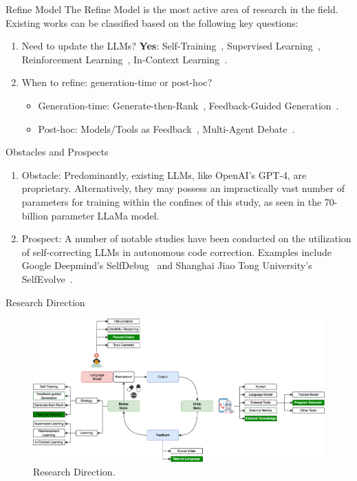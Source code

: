 \begin{frame}{Refine Model}
    The Refine Model is the most active area of research in the field. Existing works can be classified based on the following key questions:
    \begin{enumerate}
        \item Need to update the LLMs? \textbf{Yes}: Self-Training~\cite{huang2022large}, Supervised Learning~\cite{bai2022training}, Reinforcement Learning~\cite{dubois2024alpacafarm}, In-Context Learning~\cite{dong2022survey}.

        \item When to refine: generation-time or post-hoc?
              \begin{itemize}
                  \item Generation-time: Generate-then-Rank~\cite{cobbe2021training}, Feedback-Guided Generation~\cite{yao2023tree}.
                  \item Post-hoc: Models/Tools as Feedback~\cite{zhang2023selfedit}, Multi-Agent Debate~\cite{du2023improving}.
              \end{itemize}
    \end{enumerate}
\end{frame}

\begin{frame}{Obstacles and Prospects}
    \begin{enumerate}
        \item Obstacle: Predominantly, existing LLMs, like OpenAI's GPT-4, are proprietary. Alternatively, they may possess an impractically vast number of parameters for training within the confines of this study, as seen in the 70-billion parameter LLaMa model.

        \item Prospect: A number of notable studies have been conducted on the utilization of self-correcting LLMs in autonomous code correction. Examples include Google Deepmind's SelfDebug~\cite{chen2023teaching} and Shanghai Jiao Tong University's SelfEvolve~\cite{jiang2023selfevolve}.
    \end{enumerate}
\end{frame}

\begin{frame}{Research Direction}
    \begin{figure}[!htb]
        \centering
        \includegraphics[width=1\textwidth]{img/direction_of_research}
        \captionsetup{font=small,labelformat=empty}
        \caption{Research Direction.}
    \end{figure}
\end{frame}
